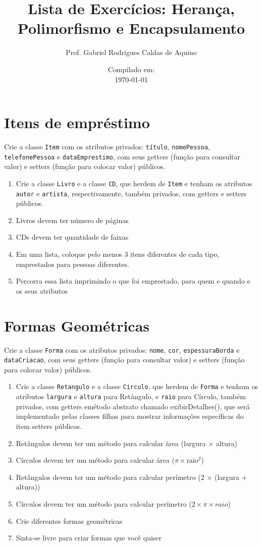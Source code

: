 \documentclass{article}
\title{Lista de Exercícios: Herança, Polimorfismo e Encapsulamento}
\author{Prof. Gabriel Rodrigues Caldas de Aquino}
\date{Compilado em: \\ \today}
\begin{document}
\maketitle

\section{Itens de empréstimo}
Crie a classe \texttt{Item} com os atributos privados: \texttt{título}, \texttt{nomePessoa}, \texttt{telefonePessoa} e 
\texttt{dataEmprestimo}, com seus getters (função para consultar valor) e setters (função para colocar valor) públicos.

\begin{enumerate}
    \item Crie a classe \texttt{Livro} e a classe \texttt{CD}, que herdem de \texttt{Item} e tenham os atributos 
    \texttt{autor} e \texttt{artista}, respectivamente, também privados, com getters e setters públicos. 
    \item Livros devem ter número de páginas
    \item CDs devem ter quantidade de faixas
    \item Em uma lista, coloque pelo menos 3 itens diferentes de cada tipo, emprestados para pessoas diferentes. 
    \item Percorra essa lista imprimindo o que foi emprestado, para quem e quando e os seus atributos 



\end{enumerate}


\section{Formas Geométricas}
Crie a classe \texttt{Forma} com os atributos privados: \texttt{nome}, \texttt{cor}, \texttt{espessuraBorda} e
\texttt{dataCriacao}, com seus getters (função para consultar valor) e setters (função para colocar valor) públicos.

\begin{enumerate}
\item Crie a classe \texttt{Retangulo} e a classe \texttt{Circulo}, que herdem de \texttt{Forma} e tenham os atributos
\texttt{largura} e \texttt{altura} para Retângulo, e \texttt{raio} para Círculo, também privados, com getters emétodo abstrato chamado exibirDetalhes(), que será implementado pelas classes filhas para mostrar informações específicas do item setters públicos.
\item Retângulos devem ter um método para calcular área (largura × altura)
\item Círculos devem ter um método para calcular área ($\pi \times \textrm{raio}^2$)
\item Retângulos devem ter um método para calcular perímetro (2 × (largura + altura))
\item Círculos devem ter um método para calcular perímetro ($2 \times \pi \times raio$)
\item Crie diferentes formas geométricas
\item Sinta-se livre para criar formas que você quiser

\end{enumerate}
\end{document}
